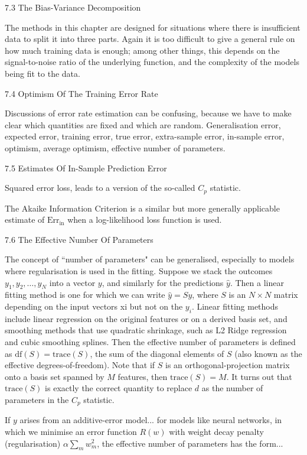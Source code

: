 7.3 The Bias-Variance Decomposition

The methods in this chapter are designed for situations where there is insufficient data to split it into three parts. Again it is too difficult to give a general rule on how much training data is enough; among other things, this depends on the signal-to-noise ratio of the underlying function, and the complexity of the models being fit to the data.

7.4 Optimism Of The Training Error Rate

Discussions of error rate estimation can be confusing, because we have
to make clear which quantities are fixed and which are random. Generalisation error, expected error, training error, true error, extra-sample error, in-sample error, optimism, average optimism, effective number of parameters.

7.5 Estimates Of In-Sample Prediction Error

Squared error loss, leads to a version of the so-called $C_p$ statistic.

The Akaike Information Criterion is a similar but more generally applicable estimate of $\text{Err}_{\text{in}}$ when a log-likelihood loss function is used.

7.6 The Effective Number Of Parameters

The concept of ``number of parameters" can be generalised, especially to
models where regularisation is used in the fitting. Suppose we stack the outcomes $y_1,y_2,\dots ,y_N$ into a vector $y$, and similarly for the predictions $\hat{y}$. Then a linear fitting method is one for which we can write $\hat{y}=Sy$, where $S$ is an $N \times N$ matrix depending on the input vectors xi but not on the $y_i$. Linear fitting methods include linear regression on the original features or on a derived basis set, and smoothing methods that use quadratic shrinkage, such as L2 Ridge regression and cubic smoothing splines. Then the effective number of parameters is defined as $\text{df}(S)=\text{trace}(S)$, the sum of the diagonal elements of $S$ (also known as the effective degrees-of-freedom). Note that if $S$ is an orthogonal-projection matrix onto a basis set spanned by $M$ features, then $\text{trace}(S)=M$. It turns out that $\text{trace}(S)$ is exactly the correct quantity to replace $d$ as the number of parameters in the $C_p$ statistic.

If $y$ arises from an additive-error model... for models like neural networks, in which we minimise an error function $R(w)$ with weight decay penalty (regularisation) $\alpha \sum_m w_m^2$, the effective number of parameters has the form...

